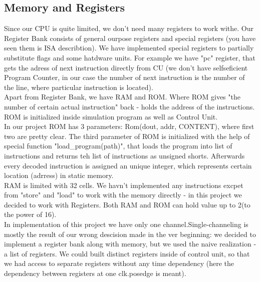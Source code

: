 \documentclass[11pt,a4paper]{article}
\begin{document}
\subsection{Memory and Registers}
Since our CPU is quite limited, we don't need many registers to work withe. Our Register Bank consists of general ourpose registers and special registers (you have seen them is ISA describtion). We have implemented special registers to partially substitute flags and some hatdware units. For example we have "pc" register, that gets the adress of next instruction directly from CU (we don't have selfseficient Program Counter, in our case the number of next instruction is the number of the line, where particular instruction is located).\\
Apart from Register Bank, we have RAM and ROM. Where ROM gives "the number of certain actual instruction" back - holds the address of the instructions. ROM is initialized inside simulation program as well as Control Unit.\\
In our project ROM has 3 parameters: Rom(dout, addr, CONTENT), where first two are pretty clear. The third parameter of ROM is initialized with the help of special function "load\_program(path)", that loads the program into list of instructions and returns teh list of instructions as unsigned shorts. Afterwards every decoded instruction is assigned an  unique integer, which represents certain location (adrress) in static memory.\\
RAM is limited with 32 cells. We havn't implemented any instructions excpet from "store" and "load" to work with the memory directly - in this project we decided to work with Registers. Both RAM and ROM can hold value up to 2(to the power of 16). \\
In implementation of this project we have only one channel.Single-channeling is mostly the result of our wrong descision made in the ver beginning: we decided to implement a register bank along with memory, but we used the naive realization - a list of registers. We could built distinct registers inside of control unit, so that we had access to separate registers without any time dependency (here the dependency between registers at one clk.posedge is meant).\\
\end{document}
